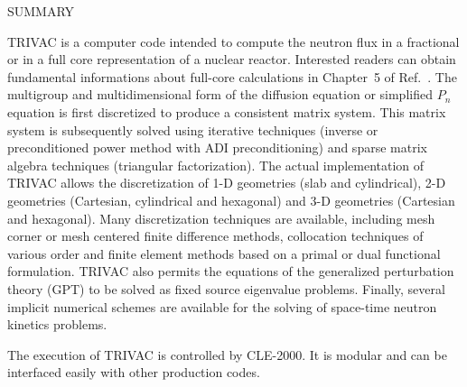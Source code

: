 \clearpage
$ $
\vskip 2.0cm

\begin{center}

SUMMARY

\end{center}

TRIVAC is a computer code intended to compute the neutron flux in a 
fractional or in a full core representation of a nuclear reactor. Interested readers
can obtain fundamental informations about full-core calculations in Chapter~5
of Ref.~. The multigroup
and multidimensional form of the diffusion equation or simplified $P_n$ equation
is first discretized to
produce a consistent matrix system. This matrix system is subsequently solved
using iterative techniques (inverse or preconditioned power method with
ADI preconditioning) and sparse matrix algebra techniques
(triangular factorization). The actual implementation of TRIVAC allows the
discretization of 1-D geometries (slab and cylindrical), 2-D geometries
(Cartesian, cylindrical and hexagonal) and 3-D geometries (Cartesian and
hexagonal). Many discretization techniques are available, including mesh corner
or mesh centered finite difference methods, collocation techniques of various
order and finite element methods based on a primal or dual functional
formulation. TRIVAC also permits  the equations of the generalized
perturbation theory (GPT) to be solved as fixed source eigenvalue problems.
Finally, several implicit numerical schemes are available for the solving of space-time
neutron kinetics problems.

\vskip 0.15cm

The execution of TRIVAC is controlled by CLE-2000.\cite{cle2000} It is
modular and can be interfaced easily with other production codes.
